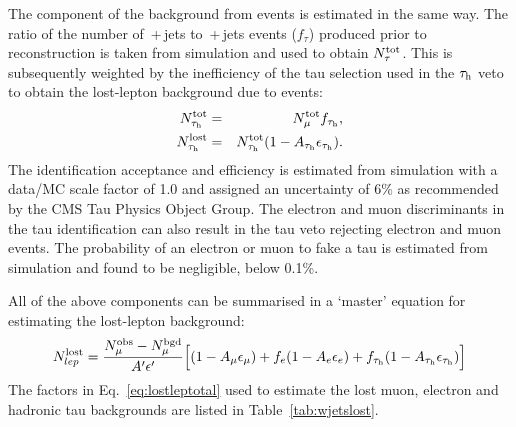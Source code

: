 The component of the \wpj{} background from \tauh events is estimated in the same way. 
The ratio of the number of \wmunubr{}\,+\,jets to \wtauhnubr\,+\,jets events ($f_{\tau}$) produced prior to reconstruction is taken from simulation and used to obtain $N^{\rm tot}_{\tau}$. This is subsequently weighted by the inefficiency of the tau selection used in the $\tau_\mathrm{h}$ veto to obtain the lost-lepton background due to \tauh events:
\begin{eqnarray}
N^{\rm tot}_{\tau_\mathrm{h}}  &=& N^{\rm tot}_{\mu}f_{\tau_\mathrm{h}},\\
N^{\rm lost}_{\tau_\mathrm{h}} &=& N^{\rm tot}_{\tau_\mathrm{h}}(1 - A_{\tau_\mathrm{h}}\epsilon_{\tau_\mathrm{h}}).
\end{eqnarray}
The \tauh identification acceptance and efficiency is estimated from simulation with a data/MC scale factor of 1.0 and assigned an uncertainty of 6$\%$ as recommended by the \ac{CMS} Tau Physics Object Group. 
The electron and muon discriminants in the tau identification can also result in the tau veto rejecting electron and muon events. 
The probability of an electron or muon to fake a tau is estimated from \wpj{} simulation and found to be negligible, below 0.1\%.

All of the above components can be summarised in a `master' equation for estimating the lost-lepton background:
\begin{equation}
N^{\rm lost}_{lep} = \frac{N^{\rm obs}_{\mu} - N^{\rm bgd}_{\mu}}{A'\epsilon'}\Big[(1 - A_{\mu}\epsilon_{\mu}) + f_{e}(1 - A_{e}\epsilon_{e}) + f_{\tau_\mathrm{h}}(1 - A_{\tau_\mathrm{h}}\epsilon_{\tau_\mathrm{h}})\Big]
\label{eq:lostleptotal}
\end{equation}
The factors in Eq.~\ref{eq:lostleptotal} used to estimate the lost muon, electron and hadronic tau backgrounds are listed in Table~\ref{tab:wjetslost}. 


